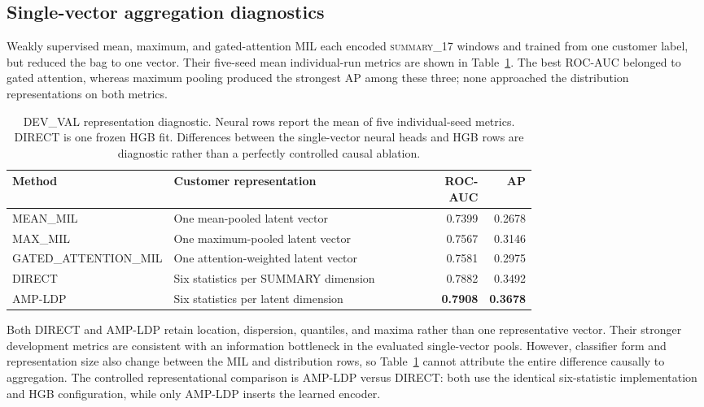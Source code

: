\subsection{Single-vector aggregation diagnostics}

Weakly supervised mean, maximum, and gated-attention MIL each encoded \textsc{summary\_17} windows and trained from one customer label, but reduced the bag to one vector. Their five-seed mean individual-run metrics are shown in Table~\ref{tab:aggregation-diagnostic}. The best ROC-AUC belonged to gated attention, whereas maximum pooling produced the strongest AP among these three; none approached the distribution representations on both metrics.

\begin{table}[t]
\caption{DEV\_VAL representation diagnostic. Neural rows report the mean of five individual-seed metrics. DIRECT is one frozen HGB fit. Differences between the single-vector neural heads and HGB rows are diagnostic rather than a perfectly controlled causal ablation.}
\label{tab:aggregation-diagnostic}
\centering
\small
\begin{tabular}{@{}p{0.28\linewidth}p{0.47\linewidth}rr@{}}
\toprule
Method & Customer representation & ROC-AUC & AP \\
\midrule
MEAN\_MIL & One mean-pooled latent vector & 0.7399 & 0.2678 \\
MAX\_MIL & One maximum-pooled latent vector & 0.7567 & 0.3146 \\
GATED\_ATTENTION\_MIL & One attention-weighted latent vector & 0.7581 & 0.2975 \\
DIRECT & Six statistics per SUMMARY dimension & 0.7882 & 0.3492 \\
AMP-LDP & Six statistics per latent dimension & \textbf{0.7908} & \textbf{0.3678} \\
\bottomrule
\end{tabular}
\end{table}

Both DIRECT and AMP-LDP retain location, dispersion, quantiles, and maxima rather than one representative vector. Their stronger development metrics are consistent with an information bottleneck in the evaluated single-vector pools. However, classifier form and representation size also change between the MIL and distribution rows, so Table~\ref{tab:aggregation-diagnostic} cannot attribute the entire difference causally to aggregation. The controlled representational comparison is AMP-LDP versus DIRECT: both use the identical six-statistic implementation and HGB configuration, while only AMP-LDP inserts the learned encoder.

